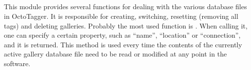 \subsection{}
\def\kapitelautor{Erik Ritschl}

This module provides several functions for dealing with the various database
files in OctoTagger. It is responsible for creating, switching, resetting
(removing all tags) and deleting galleries. Probably the most used function is
. When calling it, one can specify a certain
property, such as ``name'', ``location'' or ``connection'', and it is returned.
This method is used every time the contents of the currently active gallery
database file need to be read or modified at any point in the software.
